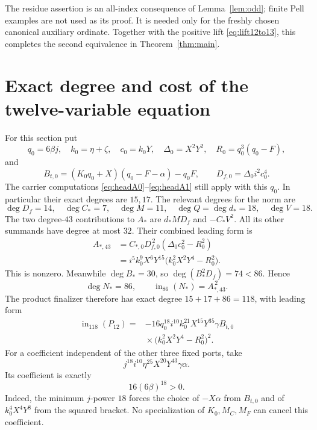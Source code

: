 \documentclass[11pt,a4paper]{article}
\theoremstyle{definition}
\theoremstyle{remark}
\newcommand{\ini}{\operatorname{in}}
\begin{document}
The residue assertion is an all-index consequence of
Lemma~\ref{lem:odd}; finite Pell examples are not used as its proof.
It is needed only for the freshly chosen canonical auxiliary ordinate.
Together with the positive lift \eqref{eq:lift12to13}, this completes
the second equivalence in Theorem~\ref{thm:main}.

\section{Exact degree and cost of the twelve-variable equation}
\label{sec:degree12}

For this section put
\[
 q_0=6\beta j,\quad k_0=\eta+\zeta,\quad c_0=k_0Y,\quad
 \Delta_0=X^2Y^2,\quad R_0=q_0^3(q_0-F),
\]
and
\[
 B_{t,0}=(K_0q_0+X)(q_0-F-\alpha)-q_0F,\qquad
 D_{f,0}=\Delta_0 i^2c_0^4.
\]
The carrier computations \eqref{eq:headA0}--\eqref{eq:headA1} still
apply with this \(q_0\). In particular their exact degrees are \(15,17\).
The relevant degrees for the norm are
\[
 \deg D_f=14,\quad \deg C_*=7,\quad \deg M=11,\quad
 \deg Q=\deg d_*=18,\quad \deg V=18.
\]
The two degree-\(43\) contributions to \(A_*\) are \(d_*MD_f\)
and \(-C_*V^2\). All its other summands have degree at most \(32\).
Their combined leading form is
\begin{align}
 A_{*,43}
  &=C_{*,0}D_{f,0}^{\,2}(\Delta_0c_0^2-R_0^2) \nonumber\\
  &=i^5k_0^9X^6Y^{15}
               \bigl(k_0^2X^2Y^4-R_0^2\bigr).             \label{eq:headnormA}
\end{align}
This is nonzero. Meanwhile \(\deg B_*=30\), so
\(\deg(B_*^2D_f)=74<86\). Hence
\[
 \deg N_*=86,\qquad \ini_{86}(N_*)=A_{*,43}^{\,2}.
\]
The product finalizer therefore has exact degree \(15+17+86=118\),
with leading form
\begin{equation}
 \boxed{\begin{aligned}
 \ini_{118}(P_{12})={}&-16q_0^{18}i^{10}k_0^{21}
           X^{15}Y^{35}\gamma B_{t,0}\\[-2pt]
 &{}\times\bigl(k_0^2X^2Y^4-R_0^2\bigr)^2.
 \end{aligned}}                                             \label{eq:head12}
\end{equation}
For a coefficient independent of the other three fixed ports, take
\begin{equation}
 j^{18}i^{10}\eta^{25}X^{20}Y^{43}\gamma\alpha.
                                                        \label{eq:monomial12}
\end{equation}
Its coefficient is exactly
\begin{equation}
 16(6\beta)^{18}>0.
                                                        \label{eq:coefficient12}
\end{equation}
Indeed, the minimum \(j\)-power \(18\) forces the choice of
\(-X\alpha\) from \(B_{t,0}\) and of
\(k_0^4X^4Y^8\) from the squared bracket.
No specialization of \(K_0,M_C,M_F\) can cancel this coefficient.
\end{document}
